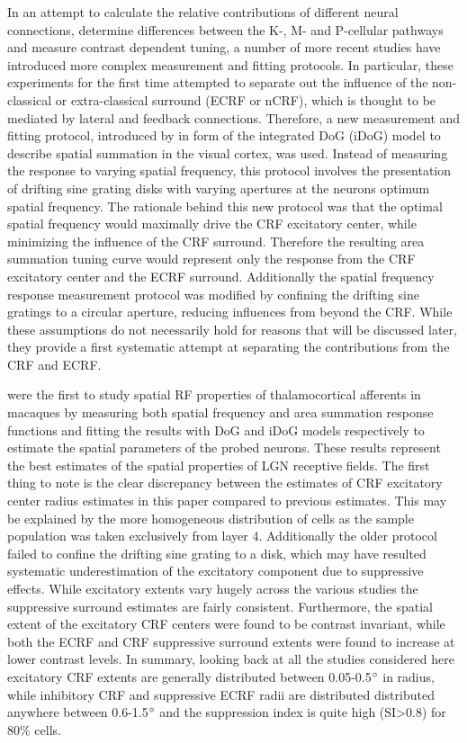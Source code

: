 In an attempt to calculate the relative contributions of different
neural connections, determine differences between the K-, M- and
P-cellular pathways and measure contrast dependent tuning, a number of
more recent studies have introduced more complex measurement and
fitting protocols. In particular, these experiments for the first time
attempted to separate out the influence of the non-classical or
extra-classical surround (ECRF or nCRF), which is thought to be
mediated by lateral and feedback connections. Therefore, a new
measurement and fitting protocol, introduced by \cite{Sceniak1999} in
form of the integrated DoG (iDoG) model to describe spatial summation
in the visual cortex, was used. Instead of measuring the response to
varying spatial frequency, this protocol involves the presentation of
drifting sine grating disks with varying apertures at the neurons
optimum spatial frequency. The rationale behind this new protocol was
that the optimal spatial frequency would maximally drive the CRF
excitatory center, while minimizing the influence of the CRF
surround. Therefore the resulting area summation tuning curve would
represent only the response from the CRF excitatory center and the
ECRF surround. Additionally the spatial frequency response measurement
protocol was modified by confining the drifting sine gratings to a
circular aperture, reducing influences from beyond the CRF. While
these assumptions do not necessarily hold for reasons that will be
discussed later, they provide a first systematic attempt at separating
the contributions from the CRF and ECRF.

\cite{Sceniak2006} were the first to study spatial RF properties of
thalamocortical afferents in macaques by measuring both spatial
frequency and area summation response functions and fitting the
results with DoG and iDoG models respectively to estimate the spatial
parameters of the probed neurons. These results represent the best
estimates of the spatial properties of LGN receptive fields. The first
thing to note is the clear discrepancy between the estimates of CRF
excitatory center radius estimates in this paper compared to previous
estimates. This may be explained by the more homogeneous distribution
of cells as the sample population was taken exclusively from layer
4. Additionally the older protocol failed to confine the drifting sine
grating to a disk, which may have resulted systematic underestimation
of the excitatory component due to suppressive effects. While
excitatory extents vary hugely across the various studies the
suppressive surround estimates are fairly consistent. Furthermore, the
spatial extent of the excitatory CRF centers were found to be contrast
invariant, while both the ECRF and CRF suppressive surround extents
were found to increase at lower contrast levels. In summary, looking
back at all the studies considered here excitatory CRF extents are
generally distributed between 0.05-0.5$\degree$ in radius, while
inhibitory CRF and suppressive ECRF radii are distributed distributed
anywhere between 0.6-1.5$\degree$ and the suppression index is quite
high (SI\textgreater0.8) for 80\% cells.

